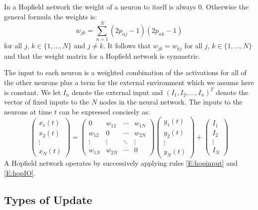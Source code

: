    In a Hopfield network the weight of a neuron to itself is always $0$.
Otherwise the general formula the weights is:
\begin{equation}\label{E:hopweights}
w_{jk} = \sum_{n=1}^N (2 p_{nj} - 1)(2 p_{nk} - 1) 
\end{equation}
for all $j$, $k \in \{1, \ldots, N\}$ and $j \neq k$.  It follows that 
$w_{jk} = w_{kj}$ for all $j$, $k \in \{1, \ldots, N\}$ and that the weight 
matrix for a Hopfield network is symmetric.  

   The input to each neuron is a weighted combination of the activations for 
all of the other neurons plus a term for the external environment which we 
assume here is constant.  We let $I_n$ denote the external input and 
$(I_1, I_2, \ldots, I_n)^T$ denote the vector of fixed inputs to the $N$ nodes 
in the neural network.  The inputs to the neurons at time $t$ can be expressed
concisely as:
\begin{equation}\label{E:hopinput}
\begin{pmatrix}
x_1(t) \\  x_2(t) \\ \vdots \\ x_N(t)
\end{pmatrix}
 = 
 \begin{pmatrix} 
     0      & w_{12} & \cdots & w_{1N} \\ 
     w_{12} &   0    & \cdots & w_{2N} \\ 
     \vdots & \vdots & \ddots & \vdots \\ 
     w_{1N} & w_{2N} & \cdots &   0  
 \end{pmatrix} 
 \begin{pmatrix} 
     y_1(t) \\ y_2(t) \\ \vdots \\ y_N(t) 
  \end{pmatrix} 
     +
\begin{pmatrix}
I_1 \\  I_2 \\ \vdots \\ I_N
\end{pmatrix}
\end{equation}
A Hopfield network operates by successively applying rules \eqref{E:hopinput} 
and \eqref{E:hopIO}.

\subsection{Types of Update}

